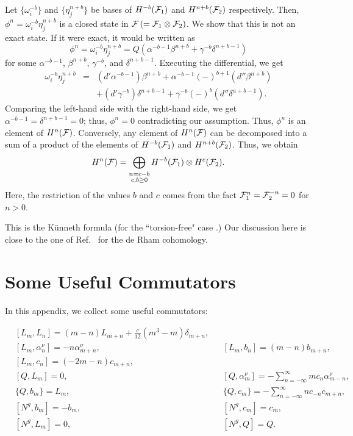 \documentclass[a4paper,12pt]{article}
\begin{document}
Let $\{ \omega_i^{-b} \}$ and $\{ \eta_j^{n+b} \}$ be bases of $H^{-b}({\cal F}_1)$ and $H^{n+b}({\cal F}_2)$ respectively. Then, $\phi^n = \omega^{-b}_i
\eta^{n+b}_j$ is a closed state in ${\cal F}\,(={\cal F}_1\otimes{\cal F}_2)$.
 We show that this is not an
exact state. If it were exact, it would be written as
\begin{equation}
%
\phi^n = \omega_i^{-b} \eta_j^{n+b} = Q (\alpha^{-b-1} \beta^{n+b} +
\gamma^{-b} \delta^{n+b-1})
%
\end{equation}
for some $\alpha^{-b-1}$, $\beta^{n+b}$, $\gamma^{-b}$, and
$\delta^{n+b-1}$. Executing the differential, we get
\begin{eqnarray}
%
\omega_i^{-b} \eta_j^{n+b} &=&
(d' \alpha^{-b-1}) \beta^{n+b} + \alpha^{-b-1} (-)^{b+1} (d'' \beta^{n+b})
\nonumber \\
&& + (d' \gamma^{-b}) \delta^{n+b-1} + \gamma^{-b} (-)^b (d'' \delta^{n+b-1}).
%
\end{eqnarray}
Comparing the left-hand side with the right-hand side, we get $\alpha^{-b-1}
= \delta^{n+b-1} = 0$; thus, $\phi^n=0$ contradicting our assumption. Thus,
$\phi^n$ is an element of $H^{n}({\cal F})$. Conversely, any element of
$H^{n}({\cal F})$ can be decomposed into a sum of a product of the elements
of $H^{-b}({\cal F}_1)$ and $H^{n+b}({\cal F}_2)$. Thus, we obtain
\begin{equation}
%
H^{n}({\cal F}) =
\bigoplus_{\stackrel{\scriptstyle n=c-b}{c, b \geq 0}}
H^{-b}({\cal F}_1) \otimes H^{c}({\cal F}_2 ).
%
\end{equation}
Here, the restriction of the values $b$ and $c$ comes from the fact
${\cal F}^n_1={\cal F}^{-n}_2=0$ for $n>0$.

This is the K\"{u}nneth formula (for the ``torsion-free" case \cite{BT}.) Our discussion here is close to the one of Ref.~\cite{nakahara} for the de Rham cohomology.


\section{Some Useful Commutators}\label{app:C}

In this appendix, we collect some useful commutators:

\begin{align}
%
&[L_{m}, L_{n}] = (m-n) L_{m+n} + \frac{c}{12} (m^3-m) \delta_{m+n},
&& \nonumber \\
&[L_{m}, \alpha^{\nu}_{n}] = -n \alpha^{\nu}_{m+n}, 
&&[L_{m}, b_{n}] = (m-n) b_{m+n}, \nonumber \\
&[L_{m}, c_{n}] = (-2m-n) c_{m+n}, 
&& \nonumber \\
&[Q, L_{m}] = 0, 
&&[Q, \alpha^{\nu}_{m}] = - \sum_{n=-\infty}^{\infty} m c_{n} \alpha^{\nu}_{m-n}, \nonumber \\
&\{ Q, b_{m} \} = L_{m}, 
&&\{ Q, c_{m} \} = - \sum_{n=-\infty}^{\infty} n c_{-n} c_{m+n}, \nonumber \\
&[N^{g}, b_{m}] = -b_{m}, 
&&[N^{g}, c_{m}] = c_{m}, \nonumber \\
&[N^{g}, L_{m}] = 0,
 &&[N^{g}, Q] = Q. \nonumber
%
\end{align}
\end{document}
